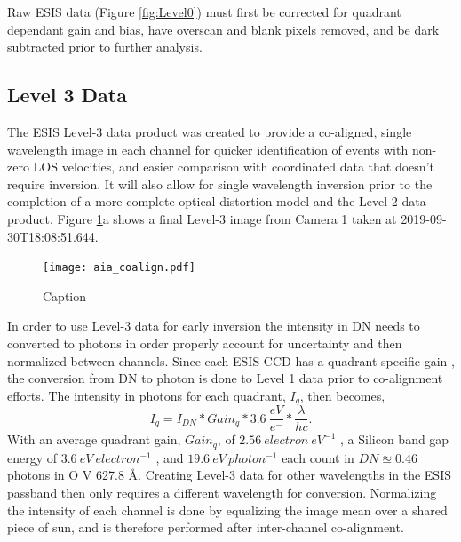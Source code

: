        Raw ESIS data (Figure \ref{fig:Level0}) must first be corrected for quadrant dependant gain and bias, have overscan and blank pixels removed, and be dark subtracted prior to further analysis.
       


    \subsection{Level 3 Data}
 
    
    	\newcommand{\vigfit}{[0.44, 0.34, 0.38, 0.5]}
    	\newcommand{\levthreetime}{2019-09-30T18:08:51.644}
    	
    	
    	The ESIS Level-3 data product was created to provide a co-aligned, single wavelength image in each channel for quicker identification of events with non-zero LOS velocities, and easier comparison with coordinated data that doesn't require inversion. 
    	It will also allow for single wavelength inversion prior to the completion of a more complete optical distortion model and the Level-2 data product.
    	Figure \ref{fig:coalign}a shows a final Level-3 image from Camera 1 taken at \levthreetime.
    	
  		\begin{figure}[htb!]
    		\centering
    		\texttt{[image: aia\_coalign.pdf]}
    		\caption{Caption }
    		\label{fig:coalign}
    	\end{figure}
    	
    
     	In order to use Level-3 data for early inversion the intensity in DN needs to  converted to photons in order properly account for uncertainty and then normalized between channels.
   		Since each ESIS CCD has a quadrant specific gain \citep{ESIS}, the conversion from DN to photon is done to Level 1 data prior to co-alignment efforts.
   		The intensity in photons for each quadrant, $I_q$, then becomes,
   		\begin{equation}
	   		I_q = I_{DN} * Gain_q * 3.6\ \frac{eV}{e^{-}} * \frac{\lambda}{hc}.
   		\end{equation}
   		With an average quadrant gain, $Gain_q$, of $2.56\ electron\ eV^{-1}$ , a Silicon band gap energy of $3.6\ eV\ electron^{-1}$ , and $19.6\ eV\ photon^{-1}$  each count in $DN \approxeq 0.46$ photons in O V 627.8 \AA .
   		Creating Level-3 data for other wavelengths in the ESIS passband then only requires a different wavelength for conversion.
   		Normalizing the intensity of each channel is done by equalizing the image mean over a shared piece of sun, and is therefore performed after inter-channel co-alignment.
   		
